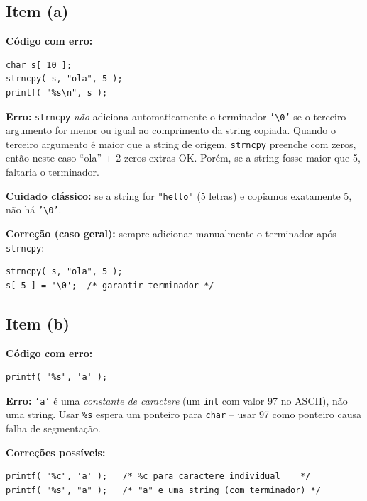 \documentclass[12pt,a4paper]{article}
\begin{document}
\subsection*{Item (a)}
\begin{respostabox}
\textbf{Código com erro:}
\begin{lstlisting}
char s[ 10 ];
strncpy( s, "ola", 5 );
printf( "%s\n", s );
\end{lstlisting}

\textbf{Erro:} \texttt{strncpy} \textit{não} adiciona automaticamente o terminador
\texttt{'\textbackslash 0'} se o terceiro argumento for menor ou igual ao
comprimento da string copiada. Quando o terceiro argumento é maior que a string
de origem, \texttt{strncpy} preenche com zeros, então neste caso ``ola'' + 2 zeros
extras OK. Porém, se a string fosse maior que 5, faltaria o terminador.

\textbf{Cuidado clássico:} se a string for \texttt{"hello"} (5 letras) e copiamos
exatamente 5, não há \texttt{'\textbackslash 0'}.

\textbf{Correção (caso geral):} sempre adicionar manualmente o terminador após
\texttt{strncpy}:
\begin{lstlisting}
strncpy( s, "ola", 5 );
s[ 5 ] = '\0';  /* garantir terminador */
\end{lstlisting}
\end{respostabox}

\subsection*{Item (b)}
\begin{respostabox}
\textbf{Código com erro:}
\begin{lstlisting}
printf( "%s", 'a' );
\end{lstlisting}

\textbf{Erro:} \texttt{'a'} é uma \textit{constante de caractere} (um \texttt{int}
com valor 97 no ASCII), não uma string. Usar \texttt{\%s} espera um ponteiro para
\texttt{char} -- usar 97 como ponteiro causa falha de segmentação.

\textbf{Correções possíveis:}
\begin{lstlisting}
printf( "%c", 'a' );   /* %c para caractere individual    */
printf( "%s", "a" );   /* "a" e uma string (com terminador) */
\end{lstlisting}
\end{respostabox}
\end{document}
